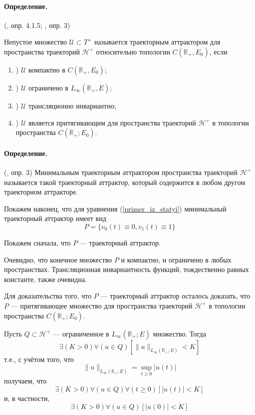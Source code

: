 \paragraph{Определение.} (\cite{Zelenaya}, опр. 4.1.5; \cite{zhidkosti_s_pamyatyu}, опр. 3)

Непустое множество $\mathcal{U}\subset T^+$
называется траекторным аттрактором для пространства траекторий $\mathcal{H}^+$
относительно топологии $C(\mathbb{R}_+,E_0)$, если
\begin{enumerate}
	\item)
		$\mathcal{U}$ компактно в $C(\mathbb{R}_+,E_0)$;
	\item)
		$\mathcal{U}$ ограничено в $L_{\infty}(\mathbb{R}_+,E)$;
	\item)
		$\mathcal{U}$ трансляционно инвариантно;
	\item)
		$\mathcal{U}$ является притягивающим для пространства траекторий $\mathcal{H}^+$
		в топологии пространства $C(\mathbb{R}_+; E_0)$.
\end{enumerate}

\paragraph{Определение.} (\cite{zhidkosti_s_pamyatyu}, опр. 3)
Минимальным траекторным аттрактором пространства траекторий $\mathcal{H}^+$
называется такой траекторный аттрактор, который содержится в любом другом траекторном аттракторе.


Покажем наконец, что для уравнения (\ref{primer_iz_statyi}) минимальный траекторный аттрактор имеет вид
\begin{equation}
	P = \{ v_0(t) \equiv 0, v_1(t) \equiv 1\}
\end{equation}

Покажем сначала, что $P$ --- траекторный аттрактор.

Очевидно, что конечное множество $P$ и компактно, и ограничено в любых пространствах.
Трансляционная инвариантность функций, тождественно равных константе, также очевидна.

Для доказательства того, что $P$ --- траекторный аттрактор осталось доказать,
что $P$ --- притягивающее множество для пространства траекторий $\mathcal{H}^+$ в топологии пространства $C(\mathbb{R}_+; E_0)$.

Пусть $Q \subset \mathcal{H}^+$ --- ограниченное в $L_{\infty}(\mathbb{R}_+;E)$ множество.
Тогда
\begin{equation}
	\exists(K>0)\forall(u\in Q)\left[ \| u \|_{L_{\infty}(\mathbb{R}_+;E)} < K\right]
\end{equation}
т.е., с учётом того, что
$$
	\| u \|_{L_{\infty}(\mathbb{R}_+;E)} = \sup_{t\geq 0}|u(t)|
$$
получаем, что
\begin{equation}
	\exists(K>0)\forall(u\in Q)\forall(t \geq 0)\left[ | u (t) | < K\right]
\end{equation}
и, в частности,
\begin{equation}
	\exists(K>0)\forall(u\in Q)\left[ | u (0) | < K\right]
\end{equation}

